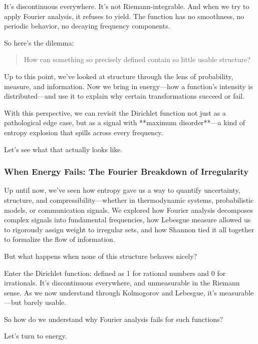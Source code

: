 It’s discontinuous everywhere. It’s not Riemann-integrable. And when we try to apply Fourier analysis, it refuses to yield. The function has no smoothness, no periodic behavior, no decaying frequency components.

So here’s the dilemma:

\begin{quote}
How can something so precisely defined contain so little usable structure?
\end{quote}

Up to this point, we’ve looked at structure through the lens of probability, measure, and information. Now we bring in energy—how a function’s intensity is distributed—and use it to explain why certain transformations succeed or fail.

With this perspective, we can revisit the Dirichlet function not just as a pathological edge case, but as a signal with **maximum disorder**—a kind of entropy explosion that spills across every frequency.

Let’s see what that actually looks like.









\subsubsection{When Energy Fails: The Fourier Breakdown of Irregularity}

Up until now, we’ve seen how entropy gave us a way to quantify uncertainty, structure, and compressibility—whether in thermodynamic systems, probabilistic models, or communication signals. We explored how Fourier analysis decomposes complex signals into fundamental frequencies, how Lebesgue measure allowed us to rigorously assign weight to irregular sets, and how Shannon tied it all together to formalize the flow of information.

But what happens when none of this structure behaves nicely?

Enter the Dirichlet function: defined as 1 for rational numbers and 0 for irrationals. It’s discontinuous everywhere, and unmeasurable in the Riemann sense. As we now understand through Kolmogorov and Lebesgue, it's measurable—but barely usable.

So how do we understand why Fourier analysis fails for such functions?

Let’s turn to energy.


